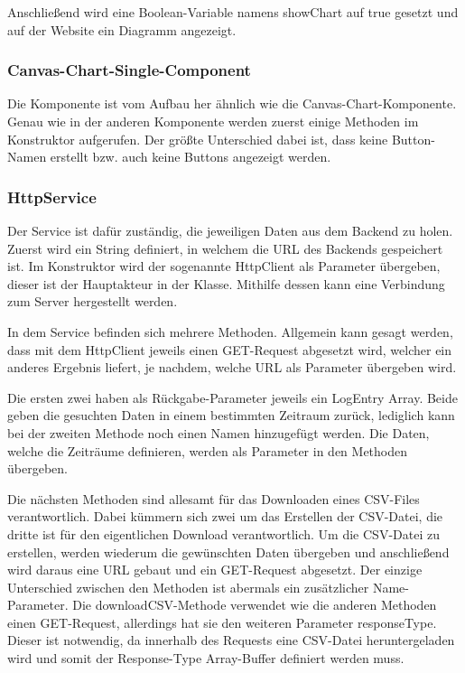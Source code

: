 Anschließend wird eine Boolean-Variable namens showChart auf true gesetzt und auf der Website ein Diagramm angezeigt.


\subsubsection{Canvas-Chart-Single-Component}
Die Komponente ist vom Aufbau her ähnlich wie die Canvas-Chart-Komponente. Genau wie in der anderen Komponente werden zuerst einige Methoden im Konstruktor aufgerufen. Der größte Unterschied dabei ist, dass keine Button-Namen erstellt bzw. auch keine Buttons angezeigt werden.


\subsubsection{HttpService}
Der Service ist dafür zuständig, die jeweiligen Daten aus dem Backend zu holen. Zuerst wird ein String definiert, in welchem die URL des Backends gespeichert ist. Im Konstruktor wird der sogenannte HttpClient als Parameter übergeben, dieser ist der Hauptakteur in der Klasse. Mithilfe dessen kann eine Verbindung zum Server hergestellt werden.


In dem Service befinden sich mehrere Methoden. Allgemein kann gesagt werden, dass mit dem HttpClient jeweils einen GET-Request abgesetzt wird, welcher ein anderes Ergebnis liefert, je nachdem, welche URL als Parameter übergeben wird.


Die ersten zwei haben als Rückgabe-Parameter jeweils ein LogEntry Array. Beide geben die gesuchten Daten in einem bestimmten Zeitraum zurück, lediglich kann bei der zweiten Methode noch einen Namen hinzugefügt werden. Die Daten, welche die Zeiträume definieren, werden als Parameter in den Methoden übergeben.


Die nächsten Methoden sind allesamt für das Downloaden eines CSV-Files verantwortlich.
Dabei kümmern sich zwei um das Erstellen der CSV-Datei, die dritte ist für den eigentlichen Download verantwortlich. Um die CSV-Datei zu erstellen, werden wiederum die gewünschten Daten übergeben und anschließend wird daraus eine URL gebaut und ein GET-Request abgesetzt. Der einzige Unterschied zwischen den Methoden ist abermals ein zusätzlicher Name-Parameter. Die downloadCSV-Methode verwendet wie die anderen Methoden einen GET-Request, allerdings hat sie den weiteren Parameter responseType. Dieser ist notwendig, da innerhalb des Requests eine CSV-Datei heruntergeladen wird und somit der Response-Type Array-Buffer definiert werden muss.


